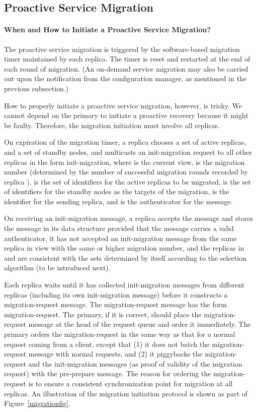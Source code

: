 \documentclass[times, 10pt, twocolumn]{article}
\begin{document}
\subsection{Proactive Service Migration}
\paragraph{When and How to Initiate a Proactive Service Migration?}
The proactive service migration is triggered by the software-based
migration timer maintained by each replica. The timer is reset and
restarted at the end of each round of migration. (An on-demand service 
migration may also be carried out upon the notification from the
configuration manager, as mentioned in the previous subsection.)

How to properly initiate a proactive service migration, however, is
tricky. We cannot depend on the primary to initiate a proactive
recovery because it might be faulty. Therefore, the migration initiation
must involve all replicas.

On expiration of the migration timer, a replica chooses a set of  active
replicas, and a set of  standby nodes, and multicasts an 
{\sc init-migration} request to all other replicas in the form 
{\sc init-migration}, where  is the 
current view,  is the migration number (determined by the number of 
successful migration rounds recorded by replica ),  is the set of 
identifiers for the  active replicas to be migrated,  is the set of 
identifiers for the  standby nodes as the targets of the migration,
 is the identifier for the sending replica, and  is the
authenticator for the message.

On receiving an {\sc init-migration} message, a replica  accepts the message
and stores the message in its data structure provided that the message
carries a valid authenticator, it has not accepted an {\sc init-migration}
message from the same replica  in view  with the same or higher
migration number, and the replicas in  and  are consistent with
the sets determined by itself according to the selection algorithm
(to be introduced next).

Each replica waits until it has collected  {\sc init-migration} 
messages from different replicas (including its own {\sc init-migration} 
message) before it constructs a {\sc migration-request} message. 
The {\sc migration-request} message has
the form {\sc migration-request}. The
primary, if it is correct, should place the {\sc migration-request}
message at the head of the request queue and order it immediately.
The primary orders the {\sc migration-request} in the same way as that for a 
normal request coming from a client, except that (1) it does not batch 
the {\sc migration-request} message with normal requests,
and (2) it piggybacks the {\sc migration-request} and the
 {\sc init-migration} messages (as proof of validity of the
migration request) with the {\sc pre-prepare} message.
The reason for ordering the {\sc migration-request} is to ensure
a consistent synchronization point for migration at all replicas.
An illustration of the migration initiation protocol is shown as part of 
Figure~\ref{migrationfig}.
\end{document}
